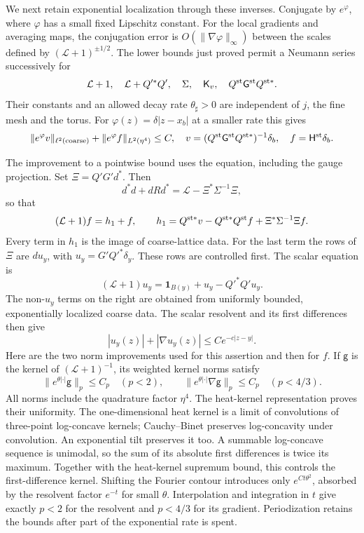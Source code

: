 \documentclass[11pt,letterpaper,reqno]{amsart}
\theoremstyle{definition}
\theoremstyle{remark}
\begin{document}
We next retain exponential localization through these inverses.
Conjugate by $e^\varphi$, where $\varphi$ has a small fixed
Lipschitz constant. For the local gradients and averaging maps,
the conjugation error is $O(\|\nabla\varphi\|_\infty)$ between
the scales defined by $(\mathcal L+1)^{\pm1/2}$. The lower
bounds just proved permit a Neumann series successively for
\[
 \mathcal L+1,\quad \mathcal L+Q'^*Q',\quad
 \Sigma,\quad \mathsf K_v,\quad
 Q^{\rm st}\mathsf G^{\rm st}Q^{{\rm st}*}.
\]
Their constants and an allowed decay rate $\theta_\sharp>0$
are independent of $j$, the fine mesh and the torus. For
$\varphi(z)=\delta|z-x_b|$ at a smaller rate this gives
\[
 \|e^\varphi v\|_{\ell^2({\rm coarse})}
       +\|e^\varphi f\|_{L^2(\eta^4)}\le C,
 \quad
 v=(Q^{\rm st}\mathsf G^{\rm st}Q^{{\rm st}*})^{-1}\delta_b,
 \quad f=\mathsf H^{\rm st}\delta_b.
\]

The improvement to a pointwise bound uses the equation, including
the gauge projection. Set $\Xi=Q'G'd^*$. Then
\[
 d^*d+dRd^*=\mathcal L-\Xi^*\Sigma^{-1}\Xi,
\]
so that
\[
 (\mathcal L+1)f=h_1+f,\qquad
 h_1=Q^{{\rm st}*}v-Q^{{\rm st}*}Q^{\rm st}f
                                  +\Xi^*\Sigma^{-1}\Xi f.
\]
Every term in $h_1$ is the image of coarse-lattice data. For the
last term the rows of $\Xi$ are $du_y$, with
$u_y=G'Q'^*\delta_y$. These rows are controlled first. The
scalar equation is
\[
 (\mathcal L+1)u_y
        =\mathbf1_{B(y)}+u_y-Q'^*Q'u_y.
\]
The non-$u_y$ terms on the right are obtained from uniformly
bounded, exponentially localized coarse data. The scalar
resolvent and its first differences then give
\[
 |u_y(z)|+|\nabla u_y(z)|\le Ce^{-c|z-y|}.
\]
Here are the two norm improvements used for this assertion and
then for $f$. If $\mathsf g$ is the kernel of
$(\mathcal L+1)^{-1}$, its weighted kernel norms satisfy
\[
 \|e^{\theta|\cdot|}\mathsf g\|_p\le C_p\quad(p<2),
 \qquad
 \|e^{\theta|\cdot|}\nabla\mathsf g\|_p\le C_p\quad(p<4/3).
\]
All norms include the quadrature factor $\eta^4$. The heat-kernel
representation proves their uniformity. The one-dimensional heat
kernel is a limit of convolutions of three-point log-concave
kernels; Cauchy--Binet preserves log-concavity under convolution.
An exponential tilt preserves it too. A summable log-concave
sequence is unimodal, so the sum of its absolute first differences
is twice its maximum. Together with the heat-kernel supremum
bound, this controls the first-difference kernel. Shifting the
Fourier contour introduces only $e^{Ct\theta^2}$, absorbed by
the resolvent factor $e^{-t}$ for small $\theta$. Interpolation
and integration in $t$ give exactly $p<2$ for the resolvent and
$p<4/3$ for its gradient. Periodization retains the bounds after
part of the exponential rate is spent.
\end{document}
